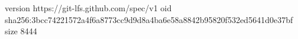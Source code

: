 version https://git-lfs.github.com/spec/v1
oid sha256:3bcc74221572a4f6a8773cc9d9d8a4ba6e58a8842b95820f532ed5641d0e37bf
size 8444
